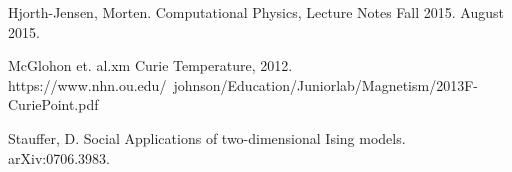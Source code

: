 \documentclass[%
oneside,                 %
final,                   %
10pt]{article}
\begin{document}
\begin{thebibliography}{9}

Hjorth-Jensen, Morten. 
Computational Physics, Lecture Notes Fall 2015. 
August 2015.

McGlohon et. al.xm
Curie Temperature, 2012.
https://www.nhn.ou.edu/~johnson/Education/Juniorlab/Magnetism/2013F-CuriePoint.pdf

Stauffer, D.
Social Applications of two-dimensional Ising models.
arXiv:0706.3983.

\end{thebibliography}



\end{document}
